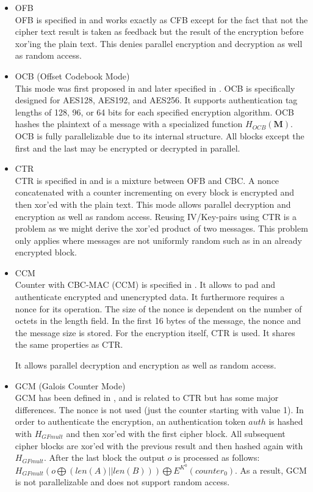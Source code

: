\begin{itemize}
	\item OFB\\
	      OFB is specified in \cite{dworkin2001recommendation} and works exactly as CFB except for the fact that not the cipher text result is taken as feedback but the result of the encryption before xor'ing the plain text. This denies parallel encryption and decryption as well as random access.
	\item OCB (Offset Codebook Mode)\\
	      This mode was first proposed in \cite{rogaway2003ocb} and later specified in \cite{krovetz-ocb-04}. OCB is specifically designed for AES128, AES192, and AES256. It supports authentication tag lengths of 128, 96, or 64 bits for each specified encryption algorithm. OCB hashes the plaintext of a message with a specialized function $H_{OCB}(\mathbf{M})$. OCB is fully parallelizable due to its internal structure. All blocks except the first and the last may be encrypted or decrypted in parallel.
	\item CTR\\
          CTR is specified in \cite{lipmaa2000ctr} and is a mixture between OFB and CBC. A nonce concatenated with a counter incrementing on every block is encrypted and then xor'ed with the plain text. This mode allows parallel decryption and encryption as well as random access. Reusing IV/Key-pairs using CTR is a problem as we might derive the xor'ed product of two messages. This problem only applies where messages are not uniformly random such as in an already encrypted block.
	\item CCM\\
          Counter with CBC-MAC (CCM) is specified in \cite{RFC3610}. It allows to pad and authenticate encrypted and unencrypted data. It furthermore requires a nonce for its operation. The size of the nonce is dependent on the number of octets in the length field. In the first 16 bytes of the message, the nonce and the message size is stored. For the encryption itself, CTR is used. It shares the same properties as CTR. 
	      
	      It allows parallel decryption and encryption as well as random access.
	\item GCM (Galois Counter Mode)\\
	      GCM has been defined in \cite{mcgrew2004galois}, and is related to CTR but has some major differences. The nonce is not used (just the counter starting with value 1). In order to authenticate the encryption, an authentication token $auth$ is hashed with $H_{GFmult}$ and then xor'ed with the first cipher block. All subsequent cipher blocks are xor'ed with the previous result and then hashed again with $H_{GFmult}$. After the last block the output $o$ is processed  as follows: $H_{GFmult}(o\bigoplus (len(A)||len(B))) \bigoplus E^{K^0}(counter_0)$. As a result, GCM is not parallelizable and does not support random access.


\end{itemize}
